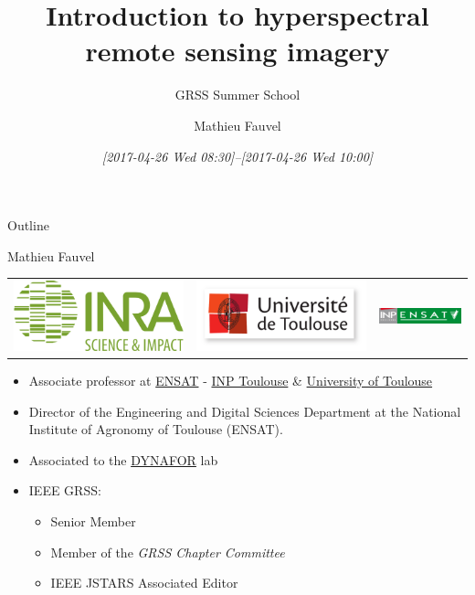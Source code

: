 \documentclass[10pt,aspectratio=1610]{beamer}
\author{Mathieu Fauvel}
\date{\textit{[2017-04-26 Wed 08:30]--[2017-04-26 Wed 10:00]}}
\title{Introduction to hyperspectral remote sensing imagery}
\subtitle{GRSS Summer School}
\institute{UMR Dynafor}
\begin{document}
\maketitle
\begin{frame}{Outline}
\tableofcontents
\end{frame}

\begin{frame}[label={sec:orgb07ce86}]{Mathieu Fauvel}
\begin{center}
\begin{tabular}{ccc}
  \includegraphics[width=0.3\linewidth]{figures/logo-INRA-transp.png}
  &\includegraphics[width=0.3\linewidth]{figures/logoUT.pdf}
  &\includegraphics[width=0.3\linewidth]{figures/inp-ensat.jpg}
\end{tabular}
\end{center}
\begin{itemize}
\item Associate professor at  \href{http://ensat.fr/}{ENSAT} - \href{http://inp-toulouse.fr/}{INP Toulouse} \& \href{http://www.univ-toulouse.fr/}{University of Toulouse}
\item Director of the Engineering and Digital Sciences Department at the National Institute of Agronomy of Toulouse (ENSAT).
\item Associated to the \href{http://dynafor.toulouse.inra.fr/}{DYNAFOR} lab
\item IEEE GRSS:
\begin{itemize}
\item Senior Member
\item Member of the \emph{GRSS Chapter Committee}
\item IEEE JSTARS Associated Editor
\end{itemize}
\end{itemize}
\end{frame}
\end{document}
